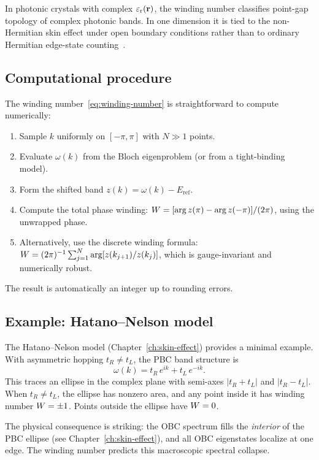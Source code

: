 In photonic crystals with complex $\varepsilon_{\mathrm{r}}(\mathbf{r})$, the winding number
classifies point-gap topology of complex photonic bands. In one
dimension it is tied to the non-Hermitian skin effect under open
boundary conditions rather than to ordinary Hermitian edge-state
counting~\cite{zhong2021non}.

\subsection{Computational procedure}
\label{ssec:winding-computation}

The winding number~\eqref{eq:winding-number} is straightforward to
compute numerically:
\begin{enumerate}
 \item Sample $k$ uniformly on $[-\pi, \pi]$ with $N \gg 1$ points.
 \item Evaluate $\omega(k)$ from the Bloch eigenproblem (or from a
 tight-binding model).
 \item Form the shifted band $z(k) = \omega(k) - E_{\mathrm{ref}}$.
 \item Compute the total phase winding:
 $W = [\arg z(\pi) - \arg z(-\pi)]/(2\pi)$, using the unwrapped
 phase.
 \item Alternatively, use the discrete winding formula:
 $W = (2\pi)^{-1}\sum_{j=1}^{N}\arg[z(k_{j+1})/z(k_j)]$, which
 is gauge-invariant and numerically robust.
\end{enumerate}
The result is automatically an integer up to rounding errors.

\subsection{Example: Hatano--Nelson model}
\label{ssec:winding-hatano-nelson}

The Hatano--Nelson model (Chapter~\ref{ch:skin-effect}) provides a
minimal example. With asymmetric hopping $t_R \neq t_L$, the PBC band
structure is
\begin{equation}
 \omega(k) = t_R\,e^{ik} + t_L\,e^{-ik}.
 \label{eq:hn-band}
\end{equation}
This traces an ellipse in the complex plane with semi-axes
$|t_R + t_L|$ and $|t_R - t_L|$. When $t_R \neq t_L$, the ellipse has
nonzero area, and any point inside it has winding number
$W = \pm 1$. Points outside the ellipse have $W = 0$.

The physical consequence is striking: the OBC spectrum fills the
\emph{interior} of the PBC ellipse (see Chapter~\ref{ch:skin-effect}),
and all OBC eigenstates localize at one edge. The winding number
predicts this macroscopic spectral collapse.


